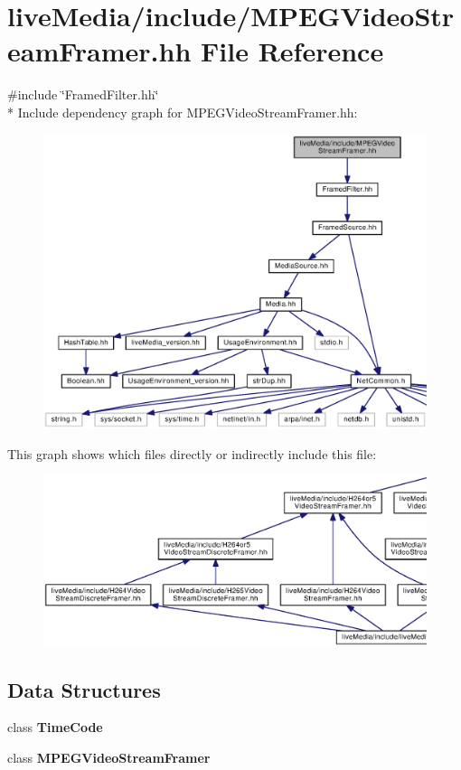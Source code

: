 \section{live\+Media/include/\+M\+P\+E\+G\+Video\+Stream\+Framer.hh File Reference}
\label{MPEGVideoStreamFramer_8hh}
{\ttfamily \#include \char`\"{}Framed\+Filter.\+hh\char`\"{}}\\*
Include dependency graph for M\+P\+E\+G\+Video\+Stream\+Framer.\+hh\+:
\nopagebreak
\begin{figure}[H]
\begin{center}
\leavevmode
\includegraphics[width=350pt]{MPEGVideoStreamFramer_8hh__incl}
\end{center}
\end{figure}
This graph shows which files directly or indirectly include this file\+:
\nopagebreak
\begin{figure}[H]
\begin{center}
\leavevmode
\includegraphics[width=350pt]{MPEGVideoStreamFramer_8hh__dep__incl}
\end{center}
\end{figure}
\subsection*{Data Structures}
\begin{DoxyCompactItemize}
\item 
class {\bf Time\+Code}
\item 
class {\bf M\+P\+E\+G\+Video\+Stream\+Framer}
\end{DoxyCompactItemize}
